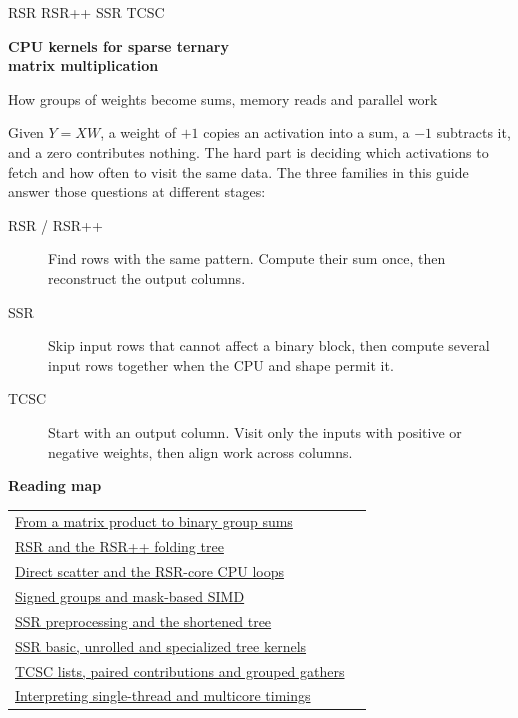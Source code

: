 \documentclass[11pt,a4paper]{article}
\newcommand{\familymark}[1]{\markboth{#1}{}}
\begin{document}
\thispagestyle{empty}
{\sffamily\large\color{outC}RSR \quad RSR++ \quad SSR \quad TCSC\par}
\vspace{0.6em}
{\sffamily\bfseries\fontsize{28}{32}\selectfont\color{ink} CPU kernels for sparse ternary\\matrix multiplication\par}
\vspace{0.5em}
{\large How groups of weights become sums, memory reads and parallel work\par}
\medskip
Given \(Y=XW\), a weight of \(+1\) copies an activation into a sum, a
\(-1\) subtracts it, and a zero contributes nothing. The hard part is deciding
which activations to fetch and how often to visit the same data. The three
families in this guide answer those questions at different stages:
\begin{description}
\item[RSR / RSR++] Find rows with the same pattern. Compute their sum once,
then reconstruct the output columns.
\item[SSR] Skip input rows that cannot affect a binary block, then compute
several input rows together when the CPU and shape permit it.
\item[TCSC] Start with an output column. Visit only the inputs with positive
or negative weights, then align work across columns.
\end{description}
\vfill
{\large\sffamily\bfseries\color{ink}Reading map\par}
\begin{center}
\begin{tabular}{@{}p{.76\linewidth}r@{}}
\toprule
\hyperref[sec:first]{From a matrix product to binary group sums} & \pageref{sec:first}\\
\hyperref[sec:fold]{RSR and the RSR++ folding tree} & \pageref{sec:fold}\\
\hyperref[sec:binary]{Direct scatter and the RSR-core CPU loops} & \pageref{sec:binary}\\
\hyperref[sec:ternary]{Signed groups and mask-based SIMD} & \pageref{sec:ternary}\\
\hyperref[sec:ssr]{SSR preprocessing and the shortened tree} & \pageref{sec:ssr}\\
\hyperref[sec:ssrcpu]{SSR basic, unrolled and specialized tree kernels} & \pageref{sec:ssrcpu}\\
\hyperref[sec:tcsc]{TCSC lists, paired contributions and grouped gathers} & \pageref{sec:tcsc}\\
\hyperref[sec:timing]{Interpreting single-thread and multicore timings} & \pageref{sec:timing}\\
\bottomrule
\end{tabular}
\end{center}
\vfill
\clearpage
\familymark{RSR and RSR++}
\end{document}
